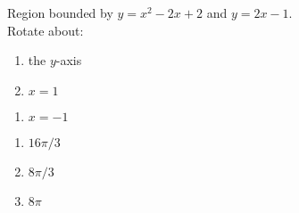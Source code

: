{Region bounded by $y=x^2-2x+2$ and $y=2x-1$.\\
Rotate about:\\
\begin{minipage}[t]{.5\linewidth}
\begin{enumerate}
\item		the $y$-axis
\item		$x=1$
\end{enumerate}
\end{minipage}%
\begin{minipage}[t]{.5\linewidth}
\begin{enumerate}\addtocounter{enumii}{2}
\item		$x=-1$
\end{enumerate}
\end{minipage}
}
{\begin{enumerate}
\item $16\pi/3$
\item $8\pi/3$
\item $8\pi$
\end{enumerate}
}
